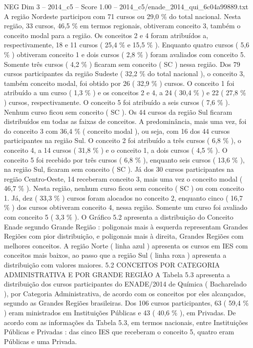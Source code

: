 \begin{textsample}{NEG Dim 3 – 2014\_c5 – Score 1.00 – 2014\_c5/enade\_2014\_qui\_6c04a99889.txt}
A região Nordeste participou com 71 cursos ou 29,0 \% do total nacional.
Nesta região, 33 cursos, 46,5 \% em termos regionais, obtiveram conceito 3, também o conceito modal para a região.
Os conceitos 2 e 4 foram atribuídos a, respectivamente, 18 e 11 cursos ( 25,4 \% e 15,5 \% ).
Enquanto quatro cursos ( 5,6 \% ) obtiveram conceito 1 e dois cursos ( 2,8 \% ) foram avaliados com conceito 5.
Somente três cursos ( 4,2 \% ) ficaram sem conceito ( SC ) nessa região.
Dos 79 cursos participantes da região Sudeste ( 32,2 \% do total nacional ), o conceito 3, também conceito modal, foi obtido por 26 ( 32,9 \% ) cursos.
O conceito 1 foi atribuído a um curso ( 1,3 \% ) e os conceitos 2 e 4, a 24 ( 30,4 \% ) e 22 ( 27,8 \% ) cursos, respectivamente.
O conceito 5 foi atribuído a seis cursos ( 7,6 \% ).
Nenhum curso ficou sem conceito ( SC ).
Os 44 cursos da região Sul ficaram distribuídos em todas as faixas de conceitos.
A predominância, mais uma vez, foi do conceito 3 com 36,4 \% ( conceito modal ), ou seja, com 16 dos 44 cursos participantes na região Sul.
O conceito 2 foi atribuído a três cursos ( 6,8 \% ), o conceito 4, a 14 cursos ( 31,8 \% ) e o conceito 1, a dois cursos ( 4,5 \% ).
O conceito 5 foi recebido por três cursos ( 6,8 \% ), enquanto seis cursos ( 13,6 \% ), na região Sul, ficaram sem conceito ( SC ).
Já dos 30 cursos participantes na região Centro-Oeste, 14 receberam conceito 3, mais uma vez o conceito modal ( 46,7 \% ).
Nesta região, nenhum curso ficou sem conceito ( SC ) ou com conceito 1.
Já, dez ( 33,3 \% ) cursos foram alocados no conceito 2, enquanto cinco ( 16,7 \% ) dos cursos obtiveram conceito 4, nessa região.
Somente um curso foi avaliado com conceito 5 ( 3,3 \% ).
O Gráfico 5.2 apresenta a distribuição do Conceito Enade segundo Grande Região : poligonais mais à esquerda representam Grandes Regiões com pior distribuição, e poligonais mais à direita, Grandes Regiões com melhores conceitos.
A região Norte ( linha azul ) apresenta os cursos em IES com conceitos mais baixos, ao passo que a região Sul ( linha roxa ) apresenta a distribuição com valores maiores. 5.2 CONCEITOS POR CATEGORIA ADMINISTRATIVA E POR GRANDE REGIÃO A Tabela 5.3 apresenta a distribuição dos cursos participantes do ENADE/2014 de Química ( Bacharelado ), por Categoria Administrativa, de acordo com os conceitos por eles alcançados, segundo as Grandes Regiões brasileiras.
Dos 106 cursos participantes, 63 ( 59,4 \% ) eram ministrados em Instituições Públicas e 43 ( 40,6 \% ), em Privadas.
De acordo com as informações da Tabela 5.3, em termos nacionais, entre Instituições Públicas e Privadas : das cinco IES que receberam o conceito 5, quatro eram Públicas e uma Privada.

\end{textsample}
